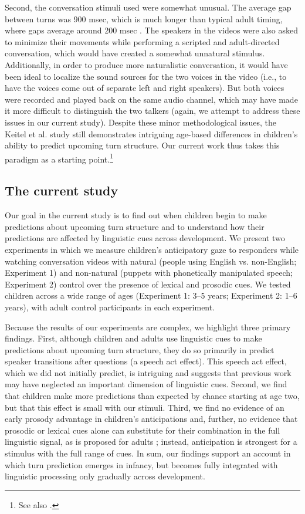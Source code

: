 \documentclass[authoryear, 12pt]{elsarticle}
\begin{document}
Second, the conversation stimuli \citet{keitel2013} used were somewhat unusual. The average gap between turns was 900 msec, which is much longer than typical adult timing, where gaps average around 200 msec \citep{stivers2009}. The speakers in the videos were also asked to minimize their movements while performing a scripted and adult-directed conversation, which would have created a somewhat unnatural stimulus. Additionally, in order to produce more naturalistic conversation, it would have been ideal to localize the sound sources for the two voices in the video (i.e., to have the voices come out of separate left and right speakers). But both voices were recorded and played back on the same audio channel, which may have made it more difficult to distinguish the two talkers (again, we attempt to address these issues in our current study). Despite these minor methodological issues, the Keitel et al. \citeyearpar{keitel2013} study still demonstrates intriguing age-based differences in children's ability to predict upcoming turn structure. Our current work thus takes this paradigm as a starting point.\footnote{See also \citet{casillas2012, casillas2013}.} 

\subsection{The current study}

Our goal in the current study is to find out when children begin to make predictions about upcoming turn structure and to understand how their predictions are affected by linguistic cues across development. We present two experiments in which we measure children's anticipatory gaze to responders while watching conversation videos with natural (people using English vs. non-English; Experiment 1) and non-natural (puppets with phonetically manipulated speech; Experiment 2) control over the presence of lexical and prosodic cues. We tested children across a wide range of ages (Experiment 1: 3--5 years; Experiment 2: 1--6 years), with adult control participants in each experiment.

Because the results of our experiments are complex, we highlight three primary findings. First, although children and adults use linguistic cues to make predictions about upcoming turn structure, they do so primarily in predict speaker transitions after questions (a speech act effect). This speech act effect, which we did not initially predict, is intriguing and suggests that previous work may have neglected an important dimension of linguistic cues. Second, we find that children make more predictions than expected by chance starting at age two, but that this effect is small with our stimuli. Third, we find no evidence of an early prosody advantage in children's anticipations and, further, no evidence that prosodic or lexical cues alone can substitute for their combination in the full linguistic signal, as is proposed for adults \citep{de-ruiter2006}; instead, anticipation is strongest for a stimulus with the full range of cues. In sum, our findings support an account in which turn prediction emerges in infancy, but becomes fully integrated with linguistic processing only gradually across development.
\end{document}
